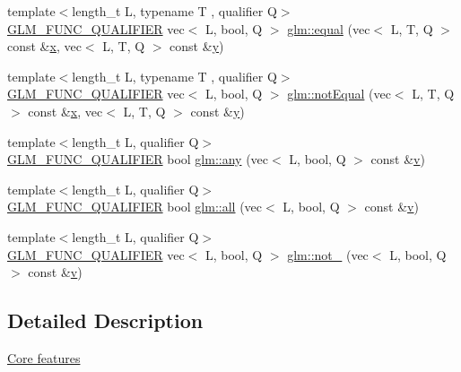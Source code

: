 \begin{DoxyCompactItemize}
\item 
{\footnotesize template$<$length\+\_\+t L, typename T , qualifier Q$>$ }\\\hyperlink{setup_8hpp_a33fdea6f91c5f834105f7415e2a64407}{G\+L\+M\+\_\+\+F\+U\+N\+C\+\_\+\+Q\+U\+A\+L\+I\+F\+I\+ER} vec$<$ L, bool, Q $>$ \hyperlink{group__core__func__vector__relational_ga774f9e3a93c913f1e7c215a549707d59}{glm\+::equal} (vec$<$ L, T, Q $>$ const \&\hyperlink{_s_d_l__opengl_8h_ad0e63d0edcdbd3d79554076bf309fd47}{x}, vec$<$ L, T, Q $>$ const \&\hyperlink{_s_d_l__opengl_8h_a1675d9d7bb68e1657ff028643b4037e3}{y})
\item 
{\footnotesize template$<$length\+\_\+t L, typename T , qualifier Q$>$ }\\\hyperlink{setup_8hpp_a33fdea6f91c5f834105f7415e2a64407}{G\+L\+M\+\_\+\+F\+U\+N\+C\+\_\+\+Q\+U\+A\+L\+I\+F\+I\+ER} vec$<$ L, bool, Q $>$ \hyperlink{group__core__func__vector__relational_gac5a72a973c81dc697dd8bb5d218e8251}{glm\+::not\+Equal} (vec$<$ L, T, Q $>$ const \&\hyperlink{_s_d_l__opengl_8h_ad0e63d0edcdbd3d79554076bf309fd47}{x}, vec$<$ L, T, Q $>$ const \&\hyperlink{_s_d_l__opengl_8h_a1675d9d7bb68e1657ff028643b4037e3}{y})
\item 
{\footnotesize template$<$length\+\_\+t L, qualifier Q$>$ }\\\hyperlink{setup_8hpp_a33fdea6f91c5f834105f7415e2a64407}{G\+L\+M\+\_\+\+F\+U\+N\+C\+\_\+\+Q\+U\+A\+L\+I\+F\+I\+ER} bool \hyperlink{group__core__func__vector__relational_gadcc289349a96ef7642b14bc151ee4ae8}{glm\+::any} (vec$<$ L, bool, Q $>$ const \&\hyperlink{_s_d_l__opengl_8h_a10a82eabcb59d2fcd74acee063775f90}{v})
\item 
{\footnotesize template$<$length\+\_\+t L, qualifier Q$>$ }\\\hyperlink{setup_8hpp_a33fdea6f91c5f834105f7415e2a64407}{G\+L\+M\+\_\+\+F\+U\+N\+C\+\_\+\+Q\+U\+A\+L\+I\+F\+I\+ER} bool \hyperlink{group__core__func__vector__relational_gab5af106b2d5675d51af84815d937384d}{glm\+::all} (vec$<$ L, bool, Q $>$ const \&\hyperlink{_s_d_l__opengl_8h_a10a82eabcb59d2fcd74acee063775f90}{v})
\item 
{\footnotesize template$<$length\+\_\+t L, qualifier Q$>$ }\\\hyperlink{setup_8hpp_a33fdea6f91c5f834105f7415e2a64407}{G\+L\+M\+\_\+\+F\+U\+N\+C\+\_\+\+Q\+U\+A\+L\+I\+F\+I\+ER} vec$<$ L, bool, Q $>$ \hyperlink{group__core__func__vector__relational_ga464f1392c934f69a917ab8bb6eda5b09}{glm\+::not\+\_\+} (vec$<$ L, bool, Q $>$ const \&\hyperlink{_s_d_l__opengl_8h_a10a82eabcb59d2fcd74acee063775f90}{v})
\end{DoxyCompactItemize}


\subsection{Detailed Description}
\hyperlink{group__core}{Core features} 